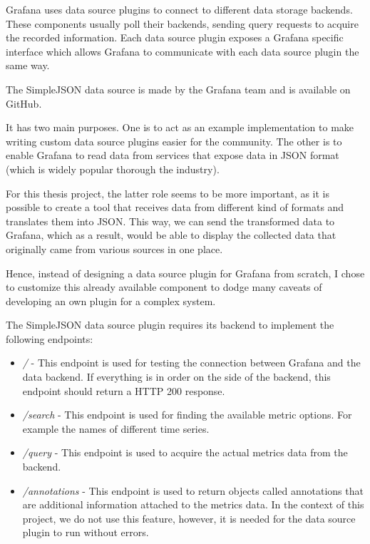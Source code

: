 Grafana uses data source plugins to connect to different data storage backends. These components usually poll their backends, sending query requests to acquire the recorded information. Each data source plugin exposes a Grafana specific interface which allows Grafana to communicate with each data source plugin the same way.

The SimpleJSON data source is made by the Grafana team and is available on GitHub. \cite{simple-json-datasource}

It has two main purposes. One is to act as an example implementation to make writing custom data source plugins easier for the community. The other is to enable Grafana to read data from services that expose data in JSON format (which is widely popular thorough the industry).

For this thesis project, the latter role seems to be more important, as it is possible to create a tool that receives data from different kind of formats and translates them into JSON. This way, we can send the transformed data to Grafana, which as a result, would be able to display the collected data that originally came from various sources in one place.

Hence, instead of designing a data source plugin for Grafana from scratch, I chose to customize this already available component to dodge many caveats of developing an own plugin for a complex system.

The SimpleJSON data source plugin requires its backend to implement the following endpoints:

\begin{itemize}
	\item \emph{/} - This endpoint is used for testing the connection between Grafana and the data backend. If everything is in order on the side of the backend, this endpoint should return a HTTP 200 response.
	\item \emph{/search} - This endpoint is used for finding the available metric options. For example the names of different time series.
	\item \emph{/query} - This endpoint is used to acquire the actual metrics data from the backend.
	\item \emph{/annotations} - This endpoint is used to return objects called annotations that are additional information attached to the metrics data. In the context of this project, we do not use this feature, however, it is needed for the data source plugin to run without errors.
\end{itemize}


